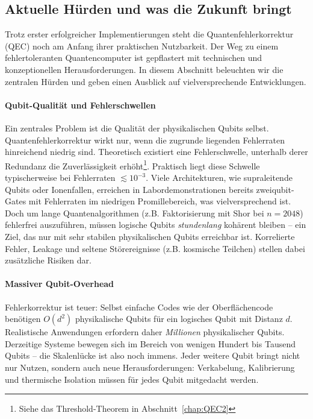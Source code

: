\subsection{Aktuelle H\"urden und was die Zukunft bringt}

Trotz erster erfolgreicher Implementierungen steht die Quantenfehlerkorrektur (QEC) noch am Anfang ihrer praktischen Nutzbarkeit. Der Weg zu einem fehlertoleranten Quantencomputer ist gepflastert mit technischen und konzeptionellen Herausforderungen. In diesem Abschnitt beleuchten wir die zentralen H\"urden und geben einen Ausblick auf vielversprechende Entwicklungen.\\

\paragraph{Qubit-Qualit\"at und Fehlerschwellen} 
Ein zentrales Problem ist die Qualit\"at der physikalischen Qubits selbst. Quantenfehlerkorrektur wirkt nur, wenn die zugrunde liegenden Fehlerraten hinreichend niedrig sind. Theoretisch existiert eine Fehlerschwelle, unterhalb derer Redundanz die Zuverl\"assigkeit erh\"oht\footnote{Siehe das Threshold-Theorem in Abschnitt~\ref{chap:QEC2}}. Praktisch liegt diese Schwelle typischerweise bei Fehlerraten $\lesssim 10^{-3}$. Viele Architekturen, wie supraleitende Qubits oder Ionenfallen, erreichen in Labordemonstrationen bereits zweiqubit-Gates mit Fehlerraten im niedrigen Promillebereich, was vielversprechend ist. Doch um lange Quantenalgorithmen (z.B. Faktorisierung mit Shor bei $n=2048$) fehlerfrei auszuf\"uhren, m\"ussen logische Qubits \emph{stundenlang} koh\"arent bleiben -- ein Ziel, das nur mit sehr stabilen physikalischen Qubits erreichbar ist. Korrelierte Fehler, Leakage und seltene St\"orereignisse (z.B. kosmische Teilchen) stellen dabei zus\"atzliche Risiken dar.

\paragraph{Massiver Qubit-Overhead}
Fehlerkorrektur ist teuer: Selbst einfache Codes wie der Oberfl\"achencode ben\"otigen $O(d^2)$ physikalische Qubits f\"ur ein logisches Qubit mit Distanz $d$. Realistische Anwendungen erfordern daher \emph{Millionen} physikalischer Qubits. Derzeitige Systeme bewegen sich im Bereich von wenigen Hundert bis Tausend Qubits -- die Skalenl\"ucke ist also noch immens. Jeder weitere Qubit bringt nicht nur Nutzen, sondern auch neue Herausforderungen: Verkabelung, Kalibrierung und thermische Isolation m\"ussen f\"ur jedes Qubit mitgedacht werden.

